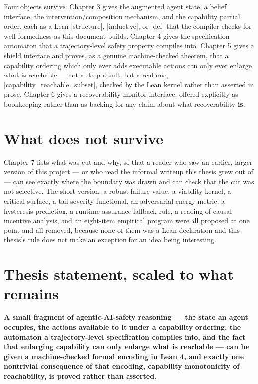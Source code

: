 \documentclass{memoir}
\begin{document}
Four objects survive. Chapter 3 gives the augmented agent state, a belief
interface, the intervention/composition mechanism, and the capability
partial order, each as a Lean \LeanVerb|structure|, \LeanVerb|inductive|, or \LeanVerb|def| that the
compiler checks for well-formedness as this document builds. Chapter 4 gives
the specification automaton that a trajectory-level safety property compiles
into. Chapter 5 gives a shield interface and proves, as a genuine
machine-checked theorem, that a capability ordering which only ever adds
executable actions can only ever enlarge what is reachable — not a deep
result, but a real one, \LeanVerb|capability_reachable_subset|, checked by the Lean
kernel rather than asserted in prose. Chapter 6 gives a recoverability
monitor interface, offered explicitly as bookkeeping rather than as backing
for any claim about what recoverability \textbf{is}.



\section{What does not survive}\label{Capability--Monotonicity--in--a--Formal--Skeleton--for--Agentic--AI--Safety----Introduction----What--does--not--survive}

Chapter 7 lists what was cut and why, so that a reader who saw an earlier,
larger version of this project — or who read the informal writeup this
thesis grew out of — can see exactly where the boundary was drawn and can
check that the cut was not selective. The short version: a robust failure
value, a viability kernel, a critical surface, a tail-severity functional, an
adversarial-energy metric, a hysteresis prediction, a runtime-assurance
fallback rule, a reading of causal-incentive analysis, and an eight-item
empirical program were all proposed at one point and all removed, because
none of them was a Lean declaration and this thesis's rule does not make an
exception for an idea being interesting.



\section{Thesis statement, scaled to what remains}\label{Capability--Monotonicity--in--a--Formal--Skeleton--for--Agentic--AI--Safety----Introduction----Thesis--statement-005F-005F-005F--scaled--to--what--remains}

\textbf{A small fragment of agentic-AI-safety reasoning — the state an agent
occupies, the actions available to it under a capability ordering, the
automaton a trajectory-level specification compiles into, and the fact that
enlarging capability can only enlarge what is reachable — can be given a
machine-checked formal encoding in Lean 4, and exactly one nontrivial
consequence of that encoding, capability monotonicity of reachability, is
proved rather than asserted.}
\end{document}
